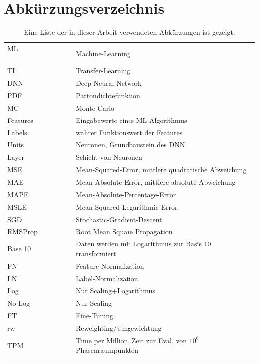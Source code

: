 \section{Abkürzungsverzeichnis}
\begin{table}[h!]
	\centering
	\caption{Eine Liste der in dieser Arbeit verwendeten Abkürzungen ist gezeigt.}
	\label{abk}
	\begin{tabular}{ll}
		ML $\hspace{3cm}$& Machine-Learning \\
		TL & Transfer-Learning \\
		DNN & Deep-Neural-Network \\
		PDF & Partondichtefunktion \\
		MC & Monte-Carlo \\
		Features & Eingabewerte eines ML-Algorithmus \\
		Labels & wahrer Funktionswert der Features \\
		Units & Neuronen, Grundbaustein des DNN \\
		Layer & Schicht von Neuronen \\
		MSE & Mean-Squared-Error, mittlere quadratische Abweichung \\
		MAE & Mean-Absolute-Error, mittlere absolute Abweichung \\
		MAPE & Mean-Absolute-Percentage-Error\\
		MSLE & Mean-Squared-Logarithmic-Error \\
		SGD & Stochastic-Gradient-Descent\\
		RMSProp & Root Mean Square Propagation \\
		Base 10& Daten werden mit Logarithmus zur Basis 10 transformiert \\
		FN & Feature-Normalization \\
		LN & Label-Normalization \\
		Log & Nur Scaling+Logarithmus \\
		No Log & Nur Scaling\\
		FT & Fine-Tuning \\
		rw & Reweighting/Umgewichtung \\
		TPM & Time per Million, Zeit zur Eval. von $10^{6}$ Phasenraumpunkten \\
		&\\
	\end{tabular}
\end{table}





